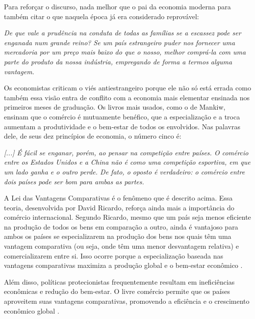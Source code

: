 Para reforçar o discurso, nada melhor que o pai da economia moderna para também citar o que naquela época já era considerado reprovável:

\begin{citacao}
    \textit{
         De que vale a prudência na conduta de todas as famílias se a escassez pode ser enganada num grande reino? Se um país estrangeiro puder nos fornecer uma mercadoria por um preço mais baixo do que o nosso, melhor comprá-la com uma parte do produto da nossa indústria, empregando de forma a termos alguma vantagem.
    } \newline
    \cite{smith1776inquiry}
\end{citacao}

Os economistas criticam o viés antiestrangeiro porque ele não só está errada como também essa visão entra de conflito com a economia mais elementar ensinada nos primeiros meses de graduação. Os livros mais usados, como o de Mankiw, ensinam que o comércio é mutuamente benéfico, que a especialização e a troca aumentam a produtividade e o bem-estar de todos os envolvidos. Nas palavras dele, de seus dez princípios de economia, o número cinco é:

\begin{citacao}
    \textit{
        [...] É fácil se enganar, porém, ao pensar na competição entre países. O comércio entre os Estados Unidos e a China não é como uma competição esportiva, em que um lado ganha e o outro perde. De fato, o oposto é verdadeiro: o comércio entre dois países pode ser bom para ambas as partes.
    } \newline
    \cite{mankiw2020introducao}
\end{citacao}

A Lei das Vantagens Comparativas é o fenômeno que é descrito acima. Essa teoria, desenvolvida por David Ricardo, reforça ainda mais a importância do comércio internacional. Segundo Ricardo, mesmo que um país seja menos eficiente na produção de todos os bens em comparação a outro, ainda é vantajoso para ambos os países se especializarem na produção dos bens nos quais têm uma vantagem comparativa (ou seja, onde têm uma menor desvantagem relativa) e comercializarem entre si. Isso ocorre porque a especialização baseada nas vantagens comparativas maximiza a produção global e o bem-estar econômico \cite{ricardo1817principles}.

Além disso, políticas protecionistas frequentemente resultam em ineficiências econômicas e redução do bem-estar. O livre comércio permite que os países aproveitem suas vantagens comparativas, promovendo a eficiência e o crescimento econômico global \cite{bhagwati2003free}.


